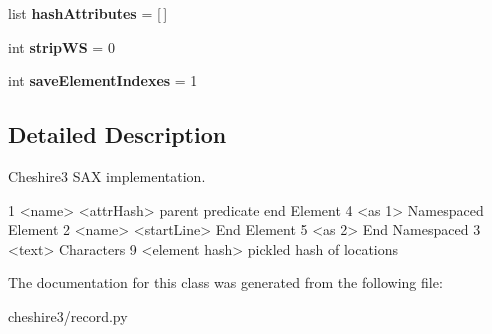 \begin{DoxyCompactItemize}
\item 
\hypertarget{classcheshire3_1_1record_1_1_sax_content_handler_ac6ac7e476d5decbaf9ac661091c05d89}{list {\bfseries hash\-Attributes} = \mbox{[}$\,$\mbox{]}}\label{classcheshire3_1_1record_1_1_sax_content_handler_ac6ac7e476d5decbaf9ac661091c05d89}

\item 
\hypertarget{classcheshire3_1_1record_1_1_sax_content_handler_a2749e54d0379bd1e02e1f5213a6f6c8a}{int {\bfseries strip\-W\-S} = 0}\label{classcheshire3_1_1record_1_1_sax_content_handler_a2749e54d0379bd1e02e1f5213a6f6c8a}

\item 
\hypertarget{classcheshire3_1_1record_1_1_sax_content_handler_a163ed97ffa731f3c31c52617ca7dc91a}{int {\bfseries save\-Element\-Indexes} = 1}\label{classcheshire3_1_1record_1_1_sax_content_handler_a163ed97ffa731f3c31c52617ca7dc91a}

\end{DoxyCompactItemize}


\subsection{Detailed Description}
\begin{DoxyVerb}Cheshire3 SAX implementation.

1 <name> <attrHash> parent predicate end
Element
4 <as 1>
Namespaced Element
2 <name> <startLine>
End Element
5 <as 2>
End Namespaced
3 <text>
Characters
9 <element hash>
pickled hash of locations
\end{DoxyVerb}
 

The documentation for this class was generated from the following file\-:\begin{DoxyCompactItemize}
\item 
cheshire3/record.\-py\end{DoxyCompactItemize}
